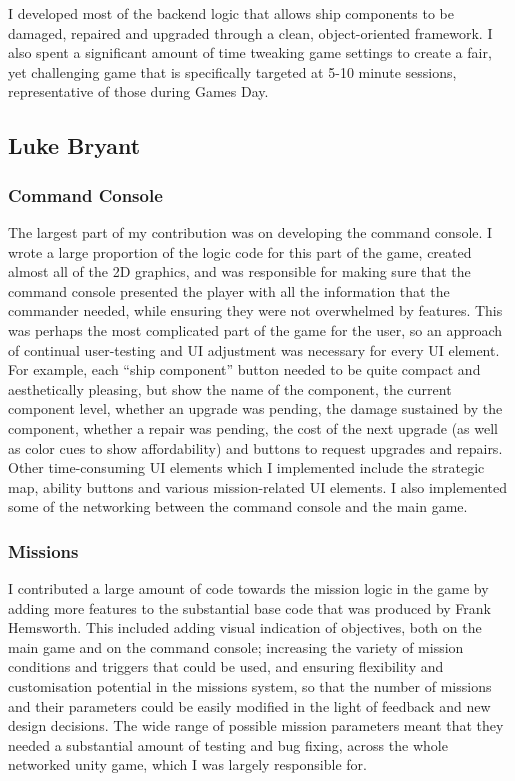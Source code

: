 \documentclass[a4paper,11pt]{article}
\begin{document}
I developed most of the backend logic that allows ship components to be damaged, repaired and upgraded through a clean, object-oriented framework. I also spent a significant amount of time tweaking game settings to create a fair, yet challenging game that is specifically targeted at 5-10 minute sessions, representative of those during Games Day.

\clearpage

\subsection{Luke Bryant}

\subsubsection{Command Console}

The largest part of my contribution was on developing the command console. I wrote a large proportion of the logic code for this part of the game, created almost all of the 2D graphics, and was responsible for making sure that the command console presented the player with all the information that the commander needed, while ensuring they were not overwhelmed by features. This was perhaps the most complicated part of the game for the user, so an approach of continual user-testing and UI adjustment was necessary for every UI element. For example, each “ship component” button needed to be quite compact and aesthetically pleasing, but show the name of the component, the current component level, whether an upgrade was pending, the damage sustained by the component, whether a repair was pending, the cost of the next upgrade (as well as color cues to show affordability) and buttons to request upgrades and repairs. Other time-consuming UI elements which I implemented include the strategic map, ability buttons and various mission-related UI elements. I also implemented some of the networking between the command console and the main game.

\subsubsection{Missions}

I contributed a large amount of code towards the mission logic in the game by adding more features to the substantial base code that was produced by Frank Hemsworth. This included adding visual indication of objectives, both on the main game and on the command console; increasing the variety of mission conditions and triggers that could be used, and ensuring flexibility and customisation potential in the missions system, so that the number of missions and their parameters could be easily modified in the light of feedback and new design decisions. The wide range of possible mission parameters meant that they needed a substantial amount of testing and bug fixing, across the whole networked unity game, which I was largely responsible for.
\end{document}
